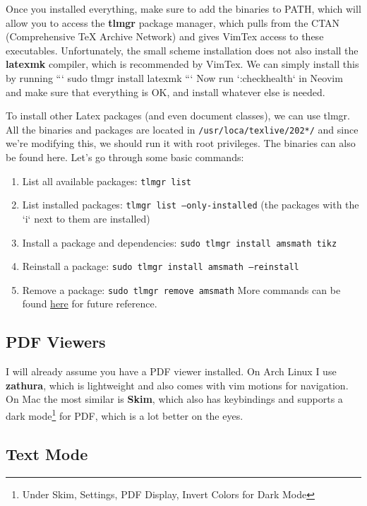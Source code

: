   Once you installed everything, make sure to add the binaries to PATH, which will allow you to access the \textbf{tlmgr} package manager, which pulls from the CTAN (Comprehensive TeX Archive Network) and gives VimTex access to these executables. Unfortunately, the small scheme installation does not also install the \textbf{latexmk} compiler, which is recommended by VimTex. We can simply install this by running 
  ```
  sudo tlmgr install latexmk
  ```
  Now run `:checkhealth` in Neovim and make sure that everything is OK, and install whatever else is needed. 


  To install other Latex packages (and even document classes), we can use tlmgr. All the binaries and packages are located in \texttt{/usr/loca/texlive/202*/} and since we're modifying this, we should run it with root privileges. The binaries can also be found here. Let's go through some basic commands: 
  \begin{enumerate}
    \item List all available packages: \texttt{tlmgr list}
    \item List installed packages: \texttt{tlmgr list --only-installed} (the packages with the `i` next to them are installed)
    \item Install a package and dependencies: \texttt{sudo tlmgr install amsmath tikz} 
    \item Reinstall a package: \texttt{sudo tlmgr install amsmath --reinstall}
    \item Remove a package: \texttt{sudo tlmgr remove amsmath} 
  More commands can be found \href{http://tug.ctan.org/info/tlmgrbasics/doc/tlmgr.pdf}{here} for future reference.  
  \end{enumerate}

\subsection{PDF Viewers}

I will already assume you have a PDF viewer installed. On Arch Linux I use \textbf{zathura}, which is lightweight and also comes with vim motions for navigation. On Mac the most similar is \textbf{Skim}, which also has keybindings and supports a dark mode\footnote{Under Skim, Settings, PDF Display, Invert Colors for Dark Mode} for PDF, which is a lot better on the eyes. 

\subsection{Text Mode}

